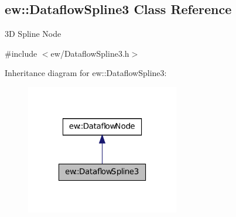 \hypertarget{classew_1_1DataflowSpline3}{
\subsection{ew::DataflowSpline3 Class Reference}
\label{classew_1_1DataflowSpline3}
}


3D Spline Node  




{\ttfamily \#include $<$ew/DataflowSpline3.h$>$}



Inheritance diagram for ew::DataflowSpline3:
\nopagebreak
\begin{figure}[H]
\begin{center}
\leavevmode
\includegraphics[width=190pt]{classew_1_1DataflowSpline3__inherit__graph}
\end{center}
\end{figure}
